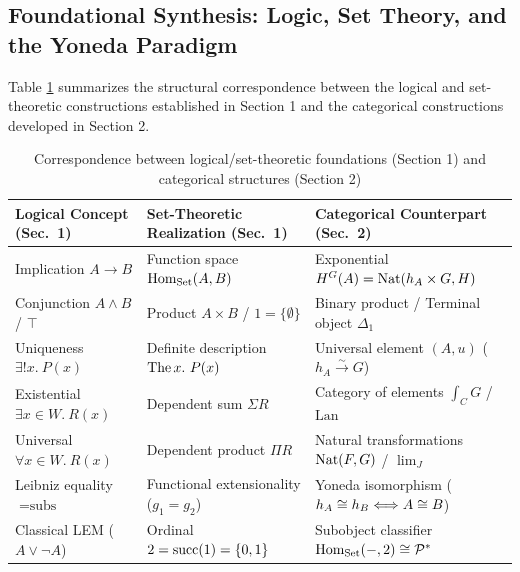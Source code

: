 \documentclass[10pt,a4paper]{article}
\begin{document}
\subsection{Foundational Synthesis: Logic, Set Theory, and the Yoneda Paradigm}
Table \ref{tab:synthesis} summarizes the structural correspondence between the logical and set-theoretic constructions established in Section 1 and the categorical constructions developed in Section 2.

\begin{table}[H]
\centering
{\small
\setlength{\tabcolsep}{1.5pt}
\caption{Correspondence between logical/set-theoretic foundations (Section 1) and categorical structures (Section 2)}
\label{tab:synthesis}
\begin{tabular}{|l|l|l|}
\hline
\textbf{Logical Concept (Sec.\ 1)} & \textbf{Set-Theoretic Realization (Sec.\ 1)} & \textbf{Categorical Counterpart (Sec.\ 2)} \\ \hline
\hline
Implication $A \to B$ & Function space ${\textrm{Hom}}_{\textrm{Set}}(A, B)$ & Exponential $H^G(A) = {\textrm{Nat}}(h_A \times G, H)$ \\ \hline
Conjunction $A \land B$ / $\top$ & Product $A \times B$ / $1 = \{\emptyset\}$ & Binary product / Terminal object $\Delta_1$ \\ \hline
Uniqueness $\exists !x.\ P(x)$ & Definite description ${\textrm{The\,}} x.\ P(x)$ & Universal element $(A, u)$ ($h_A \xrightarrow{\sim} G$) \\ \hline
Existential $\exists x \in W.\ R(x)$ & Dependent sum $\Sigma R$ & Category of elements $\int_C G$ / $\mathrm{Lan}$ \\ \hline
Universal $\forall x \in W.\ R(x)$ & Dependent product $\Pi R$ & Natural transformations ${\textrm{Nat}}(F, G)$ / $\lim_J$ \\ \hline
Leibniz equality $=\textrm{subs}$ & Functional extensionality ($g_1 = g_2$) & Yoneda isomorphism ($h_A \cong h_B \Longleftrightarrow A \cong B$) \\ \hline
Classical LEM ($A \lor \neg A$) & Ordinal $2 = {\textrm{succ}}(1) = \{0, 1\}$ & Subobject classifier ${\textrm{Hom}}_{\textrm{Set}}(-, 2) \cong {\mathcal{P}}^*$ \\ \hline
\end{tabular}}
\end{table}
\end{document}
